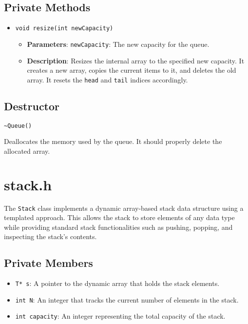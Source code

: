 \documentclass{article}
\begin{document}
\subsection{Private Methods}
\begin{itemize}
    \item \texttt{void resize(int newCapacity)}
    \begin{itemize}
        \item \textbf{Parameters}: \texttt{newCapacity}: The new capacity for the queue.
        \item \textbf{Description}: Resizes the internal array to the specified new capacity. It creates a new array, copies the current items to it, and deletes the old array. It resets the \texttt{head} and \texttt{tail} indices accordingly.
    \end{itemize}
\end{itemize}

\subsection{Destructor}
\begin{verbatim}
~Queue()
\end{verbatim}
Deallocates the memory used by the queue. It should properly delete the allocated array.

\section{stack.h}
The \texttt{Stack} class implements a dynamic array-based stack data structure using a templated approach. This allows the stack to store elements of any data type while providing standard stack functionalities such as pushing, popping, and inspecting the stack's contents.

\subsection{Private Members}
\begin{itemize}
    \item \texttt{T* s}: A pointer to the dynamic array that holds the stack elements.
    \item \texttt{int N}: An integer that tracks the current number of elements in the stack.
    \item \texttt{int capacity}: An integer representing the total capacity of the stack.
\end{itemize}
\end{document}
